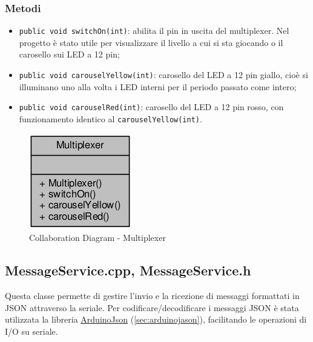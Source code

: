 \subsubsection{Metodi}
\begin{itemize}
	\item \texttt{public void switchOn(int)}: abilita il pin in uscita del multiplexer. Nel progetto è stato utile per visualizzare il livello a cui si sta giocando o il carosello sui LED a 12 pin;
	\item \texttt{public void carouselYellow(int)}: carosello del LED a 12 pin giallo, cioè si illuminano uno alla volta i LED interni per il periodo passato come intero;
	\item \texttt{public void carouselRed(int)}: carosello del LED a 12 pin rosso, con funzionamento identico al \texttt{carouselYellow(int)}.
\end{itemize}
\begin{figure}[!ht]
	\centering
	\includegraphics[scale=.5]{img/UML/CollaborationDiagram/Multiplexer.png}
	\caption{Collaboration Diagram - Multiplexer}
\end{figure}

\newpage
\subsection{MessageService.cpp, MessageService.h}
Questa classe permette di gestire l'invio e la ricezione di messaggi formattati in JSON attraverso la seriale.
Per codificare/decodificare i messaggi JSON è stata utilizzata la libreria \href{https://github.com/bblanchon/ArduinoJson}{ArduinoJson} (\ref{sec:arduinojason}), facilitando le operazioni di I/O su seriale.
